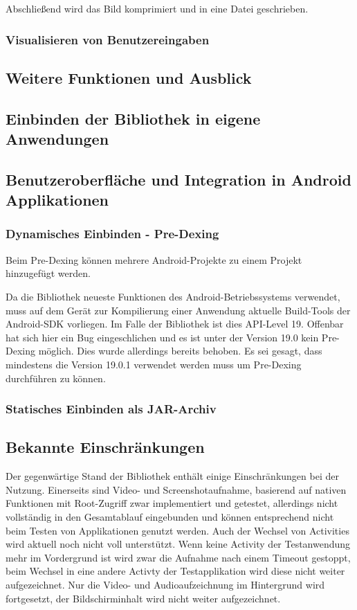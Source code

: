Abschließend wird das Bild komprimiert und in eine Datei geschrieben.

\subsubsection{Visualisieren von Benutzereingaben}

\subsection{Weitere Funktionen und Ausblick}

\subsection{Einbinden der Bibliothek in eigene Anwendungen}


\subsection{Benutzeroberfläche und Integration in Android Applikationen}


\subsubsection{Dynamisches Einbinden - Pre-Dexing}

Beim Pre-Dexing können mehrere Android-Projekte zu einem Projekt hinzugefügt werden. 

Da die Bibliothek neueste Funktionen des Android-Betriebssystems verwendet, muss auf dem  Gerät zur Kompilierung einer Anwendung aktuelle Build-Tools der Android-SDK vorliegen.
Im Falle der Bibliothek ist dies API-Level 19. Offenbar hat sich hier ein Bug eingeschlichen und es ist unter der Version 19.0 kein Pre-Dexing möglich.
Dies wurde allerdings bereits behoben. Es sei gesagt, dass mindestens die Version 19.0.1 verwendet werden muss um Pre-Dexing durchführen zu können.

\subsubsection{Statisches Einbinden als JAR-Archiv}

\subsection{Bekannte Einschränkungen}
Der gegenwärtige Stand der Bibliothek enthält einige Einschränkungen bei der Nutzung. 
Einerseits sind Video- und Screenshotaufnahme, basierend auf nativen Funktionen mit Root-Zugriff zwar implementiert und getestet, allerdings nicht vollständig in den Gesamtablauf eingebunden und können entsprechend nicht beim Testen von Applikationen genutzt werden.
Auch der Wechsel von Activities wird aktuell noch nicht voll unterstützt.
Wenn keine Activity der Testanwendung mehr im Vordergrund ist wird zwar die Aufnahme nach einem Timeout gestoppt, beim Wechsel in eine andere Activty der Testapplikation wird diese nicht weiter aufgezeichnet.
Nur die Video- und Audioaufzeichnung im Hintergrund wird fortgesetzt, der Bildschirminhalt wird nicht weiter aufgezeichnet.

